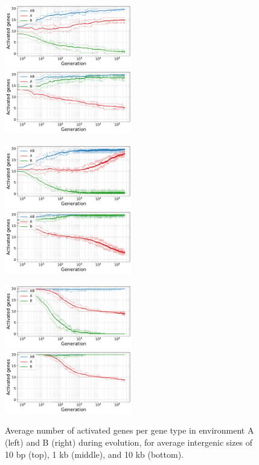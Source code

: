 \begin{figure}[H]
\centering
\includegraphics[width=0.495\textwidth]{param/mean-intergene/inter-0.01k/gene_activity_env_A.pdf}
\includegraphics[width=0.495\textwidth]{param/mean-intergene/inter-0.01k/gene_activity_env_B.pdf}

\includegraphics[width=0.495\textwidth]{param/mean-intergene/inter-1k/gene_activity_env_A.pdf}
\includegraphics[width=0.495\textwidth]{param/mean-intergene/inter-1k/gene_activity_env_B.pdf}

\includegraphics[width=0.495\textwidth]{param/mean-intergene/inter-10k/gene_activity_env_A.pdf}
\includegraphics[width=0.495\textwidth]{param/mean-intergene/inter-10k/gene_activity_env_B.pdf}
\caption[Evolution of the number of activated genes in each environment, with increasing mean intergenic distances]{Average number of activated genes per gene type in environment A (left) and B (right) during evolution, for average intergenic sizes of 10 bp (top), 1 kb (middle), and 10 kb (bottom).}
\label{fig:param:mean-intergene-activ-by-env}
\end{figure}

